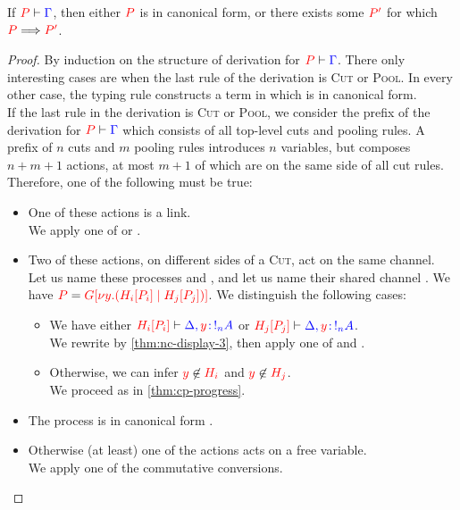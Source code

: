 \begin{theorem}[Progress]\label{thm:nc-progress}
  If $\seq[{ P }]{ \Gamma }$,
  then either $\tm{P}$ is in canonical form,
  or there exists some $\tm{P'}$ for which $\reducesto{P}{P'}$.
\end{theorem}
\begin{proof}
  By induction on the structure of derivation for $\seq[{ P }]{ \Gamma }$.
  There only interesting cases are when the last rule of the derivation is
  \textsc{Cut} or \textsc{Pool}. In every other case, the typing rule constructs
  a term in which is in canonical form. 
  \\
  If the last rule in the derivation is \textsc{Cut} or \textsc{Pool}, we
  consider the prefix of the derivation for $\seq[{ P }]{ \Gamma}$ which
  consists of all top-level cuts and pooling rules. A prefix of $n$ cuts and $m$
  pooling rules introduces $n$ variables, but composes $n+m+1$ actions, at most
  $m+1$ of which are on the same side of all cut rules.
  Therefore, one of the following must be true:
  \begin{itemize}
  \item
    One of these actions is a link.
    \\
    We apply one of  or .
  \item
    Two of these actions, on different sides of a \textsc{Cut}, act on the same channel.
    \\
    Let us name these processes  and , and let us name their
    shared channel . We have
    $\tm{P} = \tm{\cpPlug{G}{\cpCut{y}{\cpPlug{H_i}{P_i}}{\cpPlug{H_j}{P_j}}}}$.
    We distinguish the following cases:
    \begin{itemize}
    \item
      We have either
      $\seq[{ \cpPlug{H_i}{P_i}}]{ \Delta, \tmty{y}{\take[n]{A}} }$ or
      $\seq[{ \cpPlug{H_j}{P_j} }]{\Delta, \tmty{y}{\take[n]{A}} }$.
      \\
      We rewrite by \cref{thm:nc-display-3}, then apply one of  and .
    \item
      Otherwise, we can infer $\notFreeIn{y}{H_i}$ and $\notFreeIn{y}{H_j}$.
      \\
      We proceed as in \cref{thm:cp-progress}. 
    \end{itemize}
  \item
    The process is in canonical form .
  \item
    Otherwise (at least) one of the actions acts on a free variable.
    \\
    We apply one of the commutative conversions.
  \end{itemize}
\end{proof}
